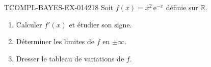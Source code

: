 \begin{exercice}{TCOMPL-BAYES-EX-014}{2}{18}
Soit $f(x) = x^2\,\mathrm{e}^{-x}$ définie sur $\mathbb{R}$.
\begin{enumerate}
  \item Calculer $f'(x)$ et étudier son signe.
  \item Déterminer les limites de $f$ en $\pm\infty$.
  \item Dresser le tableau de variations de $f$.
\end{enumerate}

\end{exercice}
